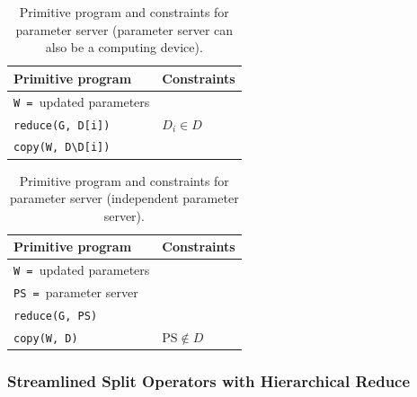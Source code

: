 \begin{table}[h]
\centering
\footnotesize
\begin{tabular}{l|l}
\textbf{Primitive program} & \textbf{Constraints} \\
\hline
\texttt{W = }updated parameters & \\
\hline
\texttt{reduce(G, D[i])} & $D_i \in D$ \\
\hline
\texttt{copy(W, D\textbackslash D[i])} &  \\
\hline
\end{tabular}
\caption{Primitive program and constraints for parameter server (parameter server can also be a computing device).}
\label{tab:parameter_server1}
\end{table}

\begin{table}[h]
  \centering
  \footnotesize
  \begin{tabular}{l|l}
  \textbf{Primitive program} & \textbf{Constraints} \\
  \hline
  \texttt{W = }updated parameters & \\
  \texttt{PS = }parameter server & \\
  \hline
  \texttt{reduce(G, PS)} & \\
  \hline
  \texttt{copy(W, D)} & $\mathrm{PS} \notin D$ \\
  \hline
  \end{tabular}
  \caption{Primitive program and constraints for parameter server (independent parameter server).}
  \label{tab:parameter_server2}
  \end{table}


\subsubsection{Streamlined Split Operators with Hierarchical Reduce}
\label{sec:hierarchical_reduce}


